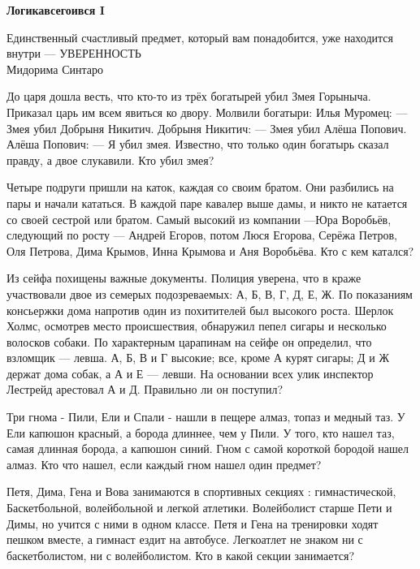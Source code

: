 \centerline{\bf \Huge Логикавсегоився I}

\begin{flushright}
        \scriptsize{Единственный счастливый предмет, который вам понадобится, уже находится внутри — УВЕРЕННОСТЬ\\ Мидорима Синтаро}
\end{flushright}

 До царя дошла весть, что кто-то из трёх богатырей убил Змея Горыныча. Приказал царь им всем явиться ко двору. Молвили богатыри: Илья Муромец: — Змея убил Добрыня Никитич. Добрыня Никитич: — Змея убил Алёша Попович. Алёша Попович: — Я убил змея. Известно, что только один богатырь сказал правду, а двое слукавили. Кто убил змея?


 Четыре подруги пришли на каток, каждая со своим братом. Они разбились на пары и начали кататься. В каждой паре кавалер выше дамы, и никто не катается со своей сестрой или братом. Самый высокий из компании —Юра Воробьёв, следующий по росту — Андрей Егоров, потом Люся Егорова, Серёжа Петров, Оля Петрова, Дима Крымов, Инна Крымова и Аня Воробьёва. Кто с кем катался?



 Из сейфа похищены важные документы. Полиция уверена, что в краже участвовали двое из семерых подозреваемых: А, Б, В, Г, Д, Е, Ж. По показаниям консьержки дома напротив один из похитителей был высокого роста. Шерлок Холмс, осмотрев место происшествия, обнаружил пепел сигары и несколько волосков собаки. По характерным царапинам на сейфе он определил, что взломщик — левша. А, Б, В и Г высокие; все, кроме А курят сигары; Д и Ж держат дома собак, а А и Е — левши. На основании всех улик инспектор Лестрейд арестовал А и Д. Правильно ли он поступил?


Три гнома - Пили, Ели и Спали - нашли в пещере алмаз, топаз и медный таз. У Ели капюшон красный, а борода длиннее, чем у Пили. У того, кто нашел таз, самая длинная борода, а капюшон синий. Гном с самой короткой бородой нашел алмаз. Кто что нашел, если каждый гном нашел один предмет?



Петя, Дима, Гена и Вова занимаются в спортивных секциях : гимнастической, Баскетбольной, волейбольной и легкой атлетики. Волейболист старше Пети и Димы, но учится с ними в одном классе. Петя и Гена на тренировки ходят пешком вместе, а гимнаст ездит на автобусе. Легкоатлет не знаком ни с баскетболистом, ни с волейболистом. Кто в какой секции занимается?

